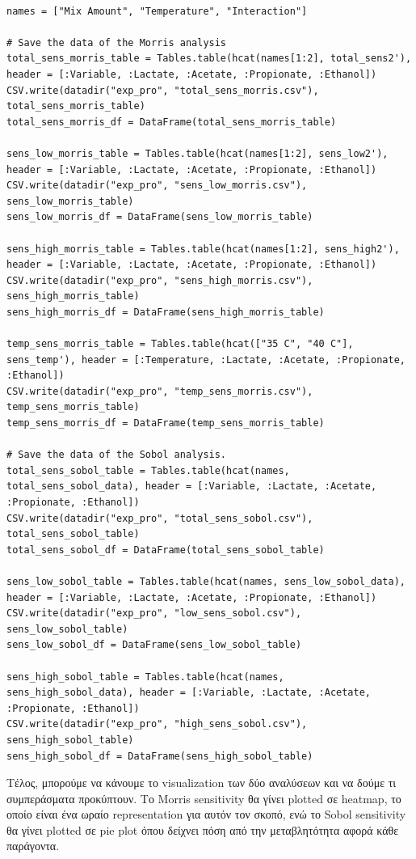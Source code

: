 \documentclass[11pt]{article}
\begin{document}
\begin{verbatim}

names = ["Mix Amount", "Temperature", "Interaction"]

# Save the data of the Morris analysis
total_sens_morris_table = Tables.table(hcat(names[1:2], total_sens2'), header = [:Variable, :Lactate, :Acetate, :Propionate, :Ethanol])
CSV.write(datadir("exp_pro", "total_sens_morris.csv"), total_sens_morris_table)
total_sens_morris_df = DataFrame(total_sens_morris_table)

sens_low_morris_table = Tables.table(hcat(names[1:2], sens_low2'), header = [:Variable, :Lactate, :Acetate, :Propionate, :Ethanol])
CSV.write(datadir("exp_pro", "sens_low_morris.csv"), sens_low_morris_table)
sens_low_morris_df = DataFrame(sens_low_morris_table)

sens_high_morris_table = Tables.table(hcat(names[1:2], sens_high2'), header = [:Variable, :Lactate, :Acetate, :Propionate, :Ethanol])
CSV.write(datadir("exp_pro", "sens_high_morris.csv"), sens_high_morris_table)
sens_high_morris_df = DataFrame(sens_high_morris_table)

temp_sens_morris_table = Tables.table(hcat(["35 C", "40 C"], sens_temp'), header = [:Temperature, :Lactate, :Acetate, :Propionate, :Ethanol])
CSV.write(datadir("exp_pro", "temp_sens_morris.csv"), temp_sens_morris_table)
temp_sens_morris_df = DataFrame(temp_sens_morris_table)

# Save the data of the Sobol analysis.
total_sens_sobol_table = Tables.table(hcat(names, total_sens_sobol_data), header = [:Variable, :Lactate, :Acetate, :Propionate, :Ethanol])
CSV.write(datadir("exp_pro", "total_sens_sobol.csv"), total_sens_sobol_table)
total_sens_sobol_df = DataFrame(total_sens_sobol_table)

sens_low_sobol_table = Tables.table(hcat(names, sens_low_sobol_data), header = [:Variable, :Lactate, :Acetate, :Propionate, :Ethanol])
CSV.write(datadir("exp_pro", "low_sens_sobol.csv"), sens_low_sobol_table)
sens_low_sobol_df = DataFrame(sens_low_sobol_table)

sens_high_sobol_table = Tables.table(hcat(names, sens_high_sobol_data), header = [:Variable, :Lactate, :Acetate, :Propionate, :Ethanol])
CSV.write(datadir("exp_pro", "high_sens_sobol.csv"), sens_high_sobol_table)
sens_high_sobol_df = DataFrame(sens_high_sobol_table)

\end{verbatim}

Τέλος, μπορούμε να κάνουμε το visualization των δύο αναλύσεων και να δούμε τι συμπεράσματα προκύπτουν. Το Morris sensitivity θα γίνει plotted σε heatmap, το οποίο είναι ένα ωραίο representation για αυτόν τον σκοπό, ενώ το Sobol sensitivity θα γίνει plotted σε pie plot όπου δείχνει πόση από την μεταβλητότητα αφορά κάθε παράγοντα.
\end{document}
